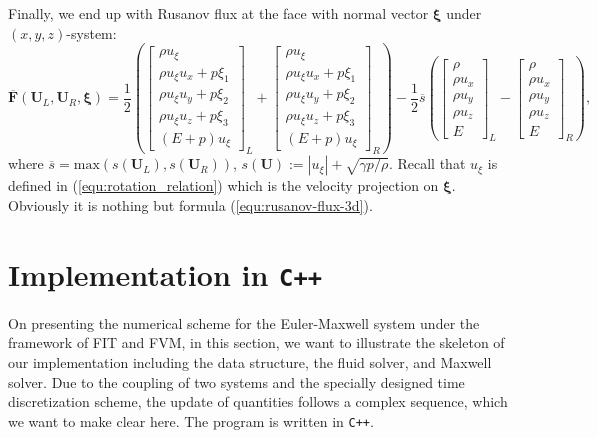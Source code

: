 \documentclass{report}
\begin{document}
\begin{appendices}
Finally, we end up with Rusanov flux at the face with normal vector $\bm{\xi}$ under $(x,y,z)$-system:
\begin{equation} \label{equ:rusanov_flux_euler}
    \overline{\mathbf{F}}(\mathbf{U}_L, \mathbf{U}_R, \bm{\xi})
    = \frac{1}{2} \left( 
    \begin{bmatrix}
    \rho u_\xi \\
    \rho u_\xi u_x + p\xi_1\\
    \rho u_\xi u_y + p\xi_2\\
    \rho u_\xi u_z + p\xi_3\\
    (E + p)u_\xi
    \end{bmatrix}_L
    +
    \begin{bmatrix}
    \rho u_\xi \\
    \rho u_\xi u_x + p\xi_1\\
    \rho u_\xi u_y + p\xi_2\\
    \rho u_\xi u_z + p\xi_3\\
    (E + p)u_\xi
    \end{bmatrix}_R
    \right)
    - \frac{1}{2}\overline{s}
    \left(
    \begin{bmatrix}
    \rho \\
    \rho u_x \\
    \rho u_y \\
    \rho u_z \\
    E
    \end{bmatrix}_L
    -
    \begin{bmatrix}
    \rho \\
    \rho u_x \\
    \rho u_y \\
    \rho u_z \\
    E
    \end{bmatrix}_R
    \right),
\end{equation}
where $\overline{s} = \text{max}(s(\mathbf{U}_L), s(\mathbf{U}_R))$, $s(\mathbf{U}) := |u_\xi| + \sqrt{\gamma p/\rho}$. Recall that $u_\xi$ is defined in (\ref{equ:rotation_relation}) which is the velocity projection on $\bm{\xi}$. Obviously it is nothing but formula (\ref{equ:rusanov-flux-3d}). 

\chapter{Implementation in \texttt{C++}}
On presenting the numerical scheme for the Euler-Maxwell system under the framework of FIT and FVM, in this section, we want to illustrate the skeleton of our implementation including the data structure, the fluid solver, and Maxwell solver. Due to the coupling of two systems and the specially designed time discretization scheme, the update of quantities follows a complex sequence, which we want to make clear here. The program is written in \texttt{C++}. 


\end{appendices}
\end{document}
